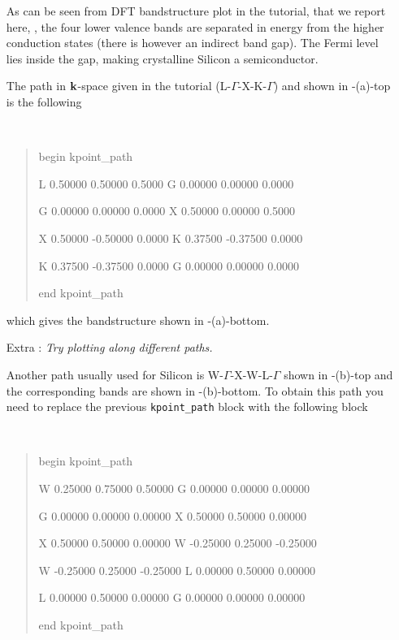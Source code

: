 \begin{enumerate}
	As can be seen from DFT bandstructure plot in the \Wannier{} tutorial, that we report here, \cf{} , the four lower valence bands are separated in energy from the higher conduction states (there is however an indirect band gap). The Fermi level lies inside the gap, making crystalline Silicon a semiconductor.

	The path in $\bfk$-space given in the tutorial (L-$\Gamma$-X-K-$\Gamma$) and shown in -(a)-top is the following
	{\tt
	\begin{quote}
begin kpoint\_path

L 0.50000  \phantom{-}0.50000 0.5000 G \phantom{-}0.00000  0.00000 0.0000

G 0.00000  \phantom{-}0.00000 0.0000 X \phantom{-}0.50000  0.00000 0.5000

X 0.50000 -0.50000 0.0000 K 0.37500 -0.37500 0.0000

K 0.37500 -0.37500 0.0000 G 0.00000  \phantom{-}0.00000 0.0000

end kpoint\_path
	\end{quote}}
	which gives the bandstructure shown in -(a)-bottom.

	\item[Extra :] {\it Try plotting along different paths.}

	Another path usually used for Silicon is \mbox{W-$\Gamma$-X-W-L-$\Gamma$} shown in -(b)-top and the corresponding bands are shown in -(b)-bottom. To obtain this path you need to replace the previous {\tt kpoint\_path} block with the following block
	{\tt
	\begin{quote}
	begin kpoint\_path

	W  \phantom{-}0.25000  0.75000  \phantom{-}0.50000 G  \phantom{-}0.00000   0.00000  \phantom{-}0.00000

	G  \phantom{-}0.00000  0.00000  \phantom{-}0.00000 X  \phantom{-}0.50000  0.50000  \phantom{-}0.00000

	X  \phantom{-}0.50000  0.50000  \phantom{-}0.00000 W -0.25000  0.25000 -0.25000

	W -0.25000  0.25000 -0.25000 L  \phantom{-}0.00000  0.50000  \phantom{-}0.00000

	L  \phantom{-}0.00000  0.50000  \phantom{-}0.00000 G  \phantom{-}0.00000  0.00000  \phantom{-}0.00000

    end kpoint\_path
	\end{quote}}


\end{enumerate}
